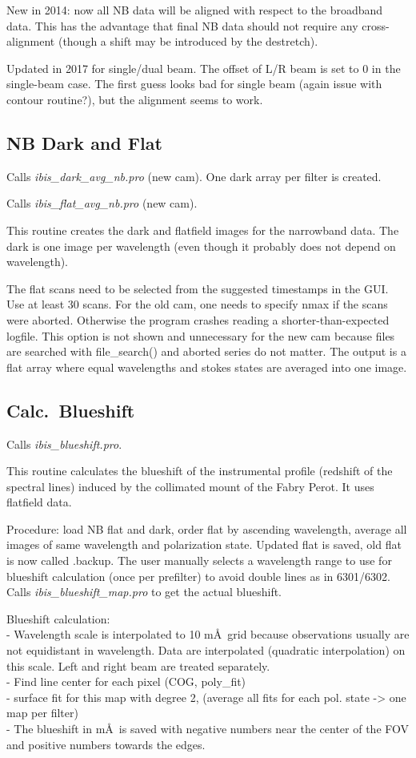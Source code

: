 \documentclass[a4paper,11pt]{article}
\begin{document}
New in 2014: now all NB data will be aligned with respect to the broadband data. This has the advantage that final NB data should not require any cross-alignment (though a shift may be introduced by the destretch).

Updated in 2017 for single/dual beam. The offset of L/R beam is set to 0 in the single-beam case. The first guess looks bad for single beam (again issue with contour routine?), but the alignment seems to work.

\subsection{NB Dark and Flat}
Calls \textit{ibis\_dark\_avg\_nb.pro} (new cam). One dark array per filter is created.

Calls \textit{ibis\_flat\_avg\_nb.pro} (new cam).

This routine creates the dark and flatfield images for the narrowband data. The dark is one image per wavelength (even though it probably does not depend on wavelength). 

The flat scans need to be selected from the suggested timestamps in the GUI. Use at least 30 scans. For the old cam, one needs to specify nmax if the scans were aborted. Otherwise the program crashes reading a shorter-than-expected logfile. This option is not shown and unnecessary for the new cam because files are searched with file\_search() and aborted series do not matter. The output is a flat array where equal wavelengths and stokes states are averaged into one image.

\subsection{Calc.~Blueshift}
Calls \textit{ibis\_blueshift.pro}.

This routine calculates the blueshift of the instrumental profile (redshift of the spectral lines) induced by the collimated mount of the Fabry Perot. It uses flatfield data.

Procedure: load NB flat and dark, order flat by ascending wavelength, average all images of same wavelength and polarization state. Updated flat is saved, old flat is now called .backup. The user manually selects a wavelength range to use for blueshift calculation (once per prefilter) to avoid double lines as in 6301/6302. Calls \textit{ibis\_blueshift\_map.pro} to get the actual blueshift.

Blueshift calculation:\\
- Wavelength scale is interpolated to 10 m\AA\ grid because observations usually are not equidistant in wavelength. Data are interpolated (quadratic interpolation) on this scale. Left and right beam are treated separately.\\
 - Find line center for each pixel (COG, poly\_fit)\\
-  surface fit for this map with degree 2, (average all fits for each pol. state -> one map per filter)\\
- The blueshift in m\AA\ is saved with negative numbers near the center of the FOV and positive numbers towards the edges. 
\end{document}
